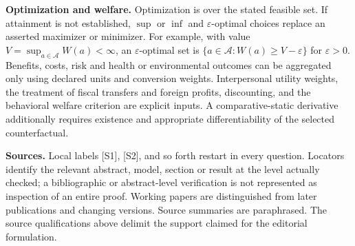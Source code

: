 \documentclass[11pt,a4paper]{article}
\begin{document}
\textbf{Optimization and welfare.} Optimization is over the stated feasible set. If attainment is not established, $\sup$ or $\inf$ and $\varepsilon$-optimal choices replace an asserted maximizer or minimizer. For example, with value $V=\sup_{a\in\mathcal A}W(a)<\infty$, an $\varepsilon$-optimal set is $\{a\in\mathcal A:W(a)\geq V-\varepsilon\}$ for $\varepsilon>0$. Benefits, costs, risk and health or environmental outcomes can be aggregated only using declared units and conversion weights. Interpersonal utility weights, the treatment of fiscal transfers and foreign profits, discounting, and the behavioral welfare criterion are explicit inputs. A comparative-static derivative additionally requires existence and appropriate differentiability of the selected counterfactual.

\textbf{Sources.} Local labels [S1], [S2], and so forth restart in every question. Locators identify the relevant abstract, model, section or result at the level actually checked; a bibliographic or abstract-level verification is not represented as inspection of an entire proof. Working papers are distinguished from later publications and changing versions. Source summaries are paraphrased. The source qualifications above delimit the support claimed for the editorial formulation.
\end{document}
